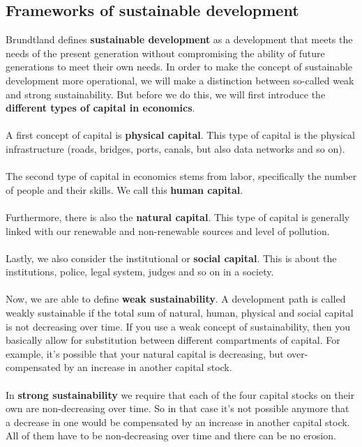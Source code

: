 \documentclass[../summary.tex]{subfiles}
\begin{document}
	\subsection{Frameworks of sustainable development}
	
	Brundtland defines \textbf{sustainable development} as a development that meets the needs of the present generation without compromising the ability of future generations to meet their own needs. In order to make the concept of sustainable development more operational, we will make a distinction between so-called weak and strong sustainability. But before we do this, we will first introduce the \textbf{different types of capital in economics}.
	\\\\
	 A first concept of capital is \textbf{physical capital}. This type of capital is the physical infrastructure (roads, bridges, ports, canals, but also data networks and so on).
	 \\\\
	 The second type of capital in economics stems from labor, specifically the number of people and their skills. We call this \textbf{human capital}.
	 \\\\
	 Furthermore, there is also the \textbf{natural capital}. This type of capital is generally linked with our renewable and non-renewable sources and level of pollution.
	 \\\\
	 Lastly, we also consider the institutional or \textbf{social capital}. This is about the institutions, police, legal system, judges and so on in a society.
	 \\\\
	 Now, we are able to define \textbf{weak sustainability}. A development path is called weakly sustainable if the total sum of natural, human, physical and social capital is not decreasing over time. If you use a weak concept of sustainability, then you basically allow for substitution between different compartments of capital. For example, it's possible that your natural capital is decreasing, but over-compensated by an increase in another capital stock.
	 \\\\
	 In \textbf{strong sustainability} we require that each of the four capital stocks on their own are non-decreasing over time. So in that case it's not possible anymore that a decrease in one would be compensated by an increase in another capital stock. All of them have to be non-decreasing over time and there can be no erosion.
\end{document}
